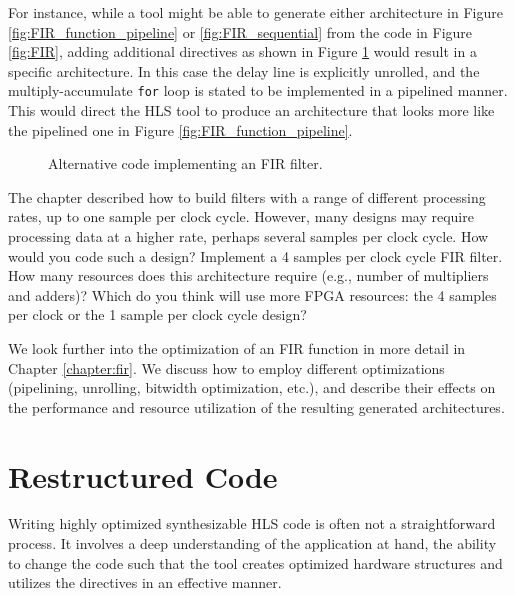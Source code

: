 For instance, while a tool might be able to generate either architecture in Figure \ref{fig:FIR_function_pipeline} or \ref{fig:FIR_sequential} from the code in Figure \ref{fig:FIR}, adding additional directives as shown in Figure \ref{fig:block_FIR} would result in a specific architecture. In this case the delay line is explicitly unrolled, and the multiply-accumulate \lstinline|for| loop is stated to be implemented in a pipelined manner. This would direct the HLS tool to produce an architecture that looks more like the pipelined one in Figure \ref{fig:FIR_function_pipeline}.

\begin{figure}

\caption{Alternative code implementing an FIR filter.}\label{fig:block_FIR}
\end{figure}




\begin{exercise}
The chapter described how to build filters with a range of different processing rates, up to one sample per clock cycle.  However, many designs may require processing data at a higher rate, perhaps several samples per clock cycle.  How would you code such a design?  Implement a 4 samples per clock cycle FIR filter.  How many resources does this architecture require (e.g., number of multipliers and adders)? Which do you think will use more FPGA resources: the 4 samples per clock or the 1 sample per clock cycle design?  
\end{exercise}

We look further into the optimization of an FIR function in more detail in Chapter \ref{chapter:fir}. We discuss how to employ different optimizations (pipelining, unrolling, bitwidth optimization, etc.), and describe their effects on the performance and resource utilization of the resulting generated architectures.

\section{Restructured Code}

Writing highly optimized synthesizable HLS code is often not a straightforward process. It involves a deep understanding of the application at hand, the ability to change the code such that the \VHLS tool creates optimized hardware structures and utilizes the directives in an effective manner. 

